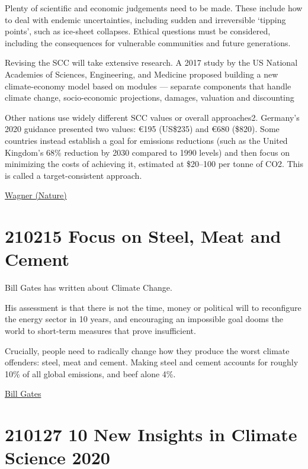 \documentclass[
]{book}
\begin{document}
Plenty of scientific and economic judgements need to be made. These include how to deal with endemic uncertainties, including sudden and irreversible `tipping points', such as ice-sheet collapses. Ethical questions must be considered, including the consequences for vulnerable communities and future generations.

Revising the SCC will take extensive research.
A 2017 study by the US National Academies of Sciences, Engineering, and Medicine
proposed building a new climate-economy model based on modules ---
separate components that handle
climate change, socio-economic projections, damages, valuation and discounting

Other nations use widely different SCC values or overall approaches2. Germany's 2020 guidance presented two values: €195 (US\$235) and €680 (\$820). Some countries instead establish a goal for emissions reductions (such as the United Kingdom's 68\% reduction by 2030 compared to 1990 levels) and then focus on minimizing the costs of achieving it, estimated at \$20--100 per tonne of CO2. This is called a target-consistent approach.

\href{https://www.nature.com/articles/d41586-021-00441-0}{Wagner (Nature)}

\hypertarget{focus-on-steel-meat-and-cement}{%
\section{210215 Focus on Steel, Meat and Cement}\label{focus-on-steel-meat-and-cement}}

Bill Gates has written about Climate Change.

His assessment is that there is not the time, money or political will to reconfigure the energy sector in 10 years, and encouraging an impossible goal dooms the world to short-term measures that prove insufficient.

Crucially, people need to radically change how they produce the worst climate offenders: steel, meat and cement. Making steel and cement accounts for roughly 10\% of all global emissions, and beef alone 4\%.

\href{https://www.theguardian.com/books/2021/feb/13/imperfect-messenger-bill-gates-on-what-needs-to-change-to-avoid-climate-disaster}{Bill Gates}

\hypertarget{new-insights-in-climate-science-2020}{%
\section{210127 10 New Insights in Climate Science 2020}\label{new-insights-in-climate-science-2020}}
\end{document}
